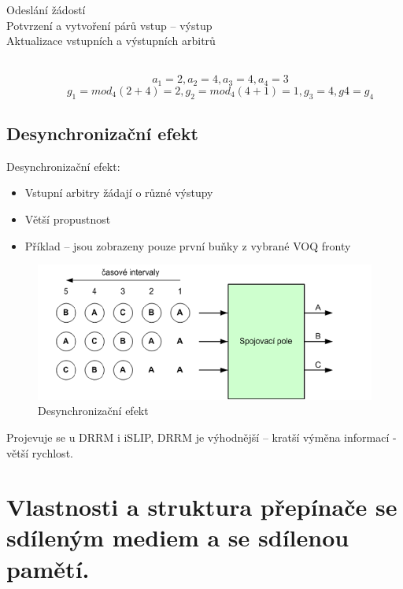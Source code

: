 \begin{description}
\item [Odeslání žádostí] \hfill
\item [Potvrzení a vytvoření párů vstup -- výstup] \hfill
\item [Aktualizace vstupních a výstupních arbitrů] \hfill \\
\begin{equation}
    a_1 = 2, a_2 = 4, a_3 = 4, a_4 = 3
\end{equation}
\begin{equation}
    g_1 = mod_4{(2+4)} = 2, g_2 = mod_4{(4+1) = 1}, g_3 = 4, g4 = g_4
\end{equation}
\end{description}
\subsection{Desynchronizační efekt}
Desynchronizační efekt:
\begin{itemize}
    \item Vstupní arbitry žádají o různé výstupy
    \item Větší propustnost
    \item Příklad -- jsou zobrazeny pouze první buňky z vybrané VOQ fronty
\end{itemize}
\begin{figure}[ht]
\centering
  \begin{center}
    \includegraphics[scale=0.6]{images/DRRM_desyn.png}
  \end{center}
  \caption[Desynchronizační efekt]{Desynchronizační efekt}
\end{figure}
Projevuje se u DRRM i iSLIP, DRRM je výhodnější -- kratší výměna informací - větší rychlost.

\newpage
\section{Vlastnosti a struktura přepínače se sdíleným mediem a se sdílenou pamětí.}
